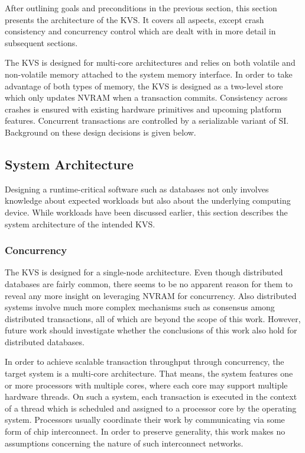 After outlining goals and preconditions in the previous section, this section
presents the architecture of the KVS. It covers all aspects, except crash
consistency and concurrency control which are dealt with in more detail in
subsequent sections.

The KVS is designed for multi-core architectures and relies on both volatile and
non-volatile memory attached to the system memory interface. In order to take
advantage of both types of memory, the KVS is designed as a two-level store
which only updates NVRAM when a transaction commits. Consistency across crashes
is ensured with existing hardware primitives and upcoming platform features.
Concurrent transactions are controlled by a serializable variant of SI.
Background on these design decisions is given below.

\subsection{System Architecture}

Designing a runtime-critical software such as databases not only involves
knowledge about expected workloads but also about the underlying computing
device. While workloads have been discussed earlier, this section describes the
system architecture of the intended KVS.

\subsubsection{Concurrency}

The KVS is designed for a single-node architecture. Even though distributed
databases are fairly common, there seems to be no apparent reason for them to
reveal any more insight on leveraging NVRAM for concurrency. Also distributed
systems involve much more complex mechanisms such as consensus among distributed
transactions, all of which are beyond the scope of this work. However, future
work should investigate whether the conclusions of this work also hold for
distributed databases.

In order to achieve scalable transaction throughput through concurrency, the
target system is a multi-core architecture. That means, the system features one
or more processors with multiple cores, where each core may support multiple
hardware threads. On such a system, each transaction is executed in the context
of a thread which is scheduled and assigned to a processor core by the operating
system. Processors usually coordinate their work by communicating via some form
of chip interconnect. In order to preserve generality, this work makes no
assumptions concerning the nature of such interconnect networks.

